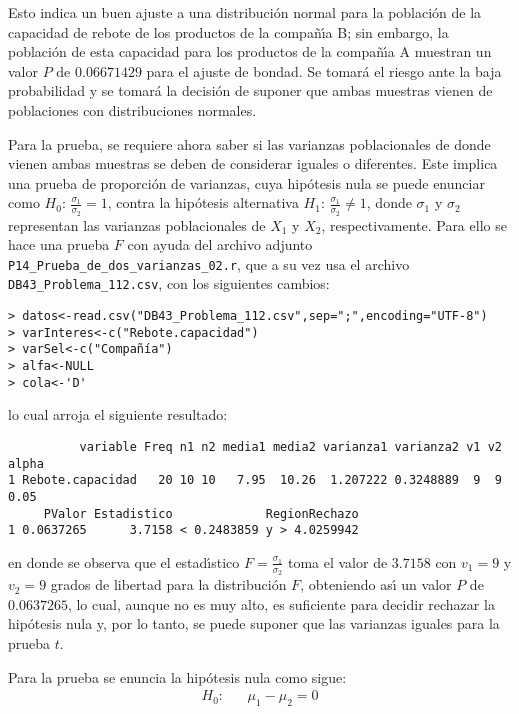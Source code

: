 \begin{solucion}
 \vspace{-0.5cm}
 Esto indica un buen ajuste a una distribuci\'on normal
 para la poblaci\'on de la capacidad de rebote de los productos
 de la compa\~n\'{\i}a B;
 sin embargo, la poblaci\'on de esta capacidad para los productos
 de la compa\~n\'{\i}a A
 muestran un valor $P$ de $0.06671429$ para el ajuste de bondad.
 Se tomar\'a el riesgo ante la baja probabilidad
 y se tomar\'a la decisi\'on de suponer que ambas muestras vienen
 de poblaciones con distribuciones normales.
 \par
 Para la prueba, se requiere ahora saber si las varianzas poblacionales
 de donde vienen ambas muestras se deben de considerar iguales
 o diferentes. Este implica una prueba de proporci\'on de varianzas,
 cuya hip\'otesis nula se puede enunciar como
 $H_0: \, \frac{\sigma_1}{\sigma_2} = 1$, contra la hip\'otesis
 alternativa $H_1: \, \frac{\sigma_1}{\sigma_2} \neq 1$,
 donde $\sigma_1$ y $\sigma_2$ representan las varianzas poblacionales
 de $X_1$ y $X_2$, respectivamente.
 Para ello se hace una prueba $F$ con ayuda del archivo adjunto
 \texttt{P14\_Prueba\_de\_dos\_varianzas\_02.r},
 que a su vez usa el archivo \texttt{DB43\_Problema\_112.csv},
 con los siguientes cambios:
 \begin{verbatim}
> datos<-read.csv("DB43_Problema_112.csv",sep=";",encoding="UTF-8")
> varInteres<-c("Rebote.capacidad")
> varSel<-c("Compañía")
> alfa<-NULL
> cola<-'D'
 \end{verbatim}
 \vspace{-0.5cm}
 lo cual arroja el siguiente resultado:
 \begin{verbatim}
          variable Freq n1 n2 media1 media2 varianza1 varianza2 v1 v2 alpha
1 Rebote.capacidad   20 10 10   7.95  10.26  1.207222 0.3248889  9  9  0.05
     PValor Estadistico             RegionRechazo
1 0.0637265      3.7158 < 0.2483859 y > 4.0259942
 \end{verbatim}
 \vspace{-0.5cm}
 en donde se observa que el estad\'{\i}stico $F=\frac{\sigma_1}{\sigma_2}$
 toma el valor de $3.7158$ con $v_1 = 9$ y $v_2 = 9$ grados
 de libertad para la distribuci\'on $F$,
 obteniendo as\'{\i} un valor $P$ de $0.0637265$,
 lo cual, aunque no es muy alto, es suficiente para decidir rechazar
 la hip\'otesis nula y, por lo tanto, se puede suponer que las varianzas iguales para la prueba $t$.
 \par 
 Para la prueba se enuncia la hip\'otesis nula como sigue:
 \begin{eqnarray*}
  H_0: & & \mu_1 - \mu_2   =   0 \\

\end{eqnarray*}
\end{solucion}
